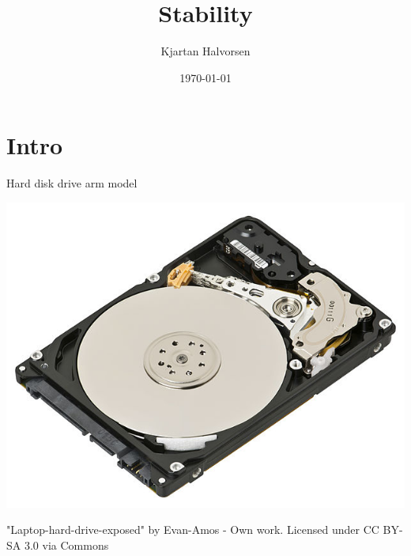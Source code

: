 \documentclass[presentation,aspectratio=169]{beamer}
\author{Kjartan Halvorsen}
\date{\today}
\title{Stability}
\begin{document}
\maketitle

\section{Intro}
\label{sec:orgd9a4d2f}

\begin{frame}[label={sec:orgfa2845f}]{Hard disk drive arm model}
\begin{center}
\includegraphics[width=0.4\linewidth]{../../figures/diskdrive.png}
\end{center}

{\tiny "Laptop-hard-drive-exposed" by Evan-Amos - Own work. Licensed under CC BY-SA 3.0 via Commons } 
\end{frame}
\end{document}
